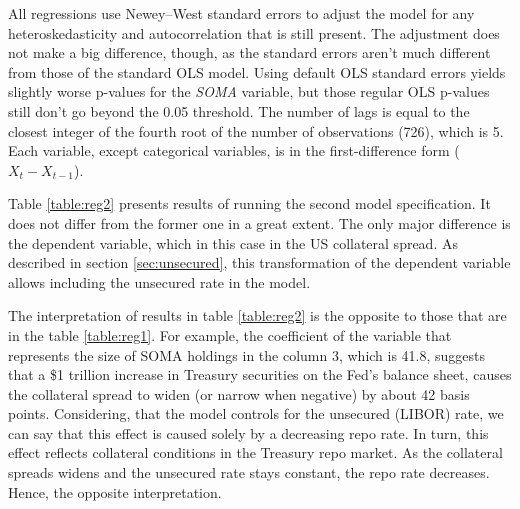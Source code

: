 \documentclass[11pt,a4paper,english,oneside]{article}
\begin{document}
All regressions use Newey–West standard errors to adjust the model for any heteroskedasticity and autocorrelation that is still present. The adjustment does not make a big difference, though, as the standard errors aren't much different from those of the standard OLS model. Using default OLS standard errors yields slightly worse p-values for the \emph{SOMA} variable, but those regular OLS p-values still don't go beyond the 0.05 threshold. The number of lags is equal to the closest integer of the fourth root of the number of observations (726), which is 5. Each variable, except categorical variables, is in the first-difference form ($X_t-X_{t-1}$).

Table \ref{table:reg2} presents results of running the second model specification. It does not differ from the former one in a great extent. The only major difference is the dependent variable, which in this case in the US collateral spread. As described in section \ref{sec:unsecured}, this transformation of the dependent variable allows including the unsecured rate in the model.

The interpretation of results in table \ref{table:reg2} is the opposite to those that are in the table \ref{table:reg1}. For example, the coefficient of the variable that represents the size of SOMA holdings in the column 3, which is 41.8, suggests that a \$1 trillion increase in Treasury securities on the Fed's balance sheet, causes the collateral spread to widen (or narrow when negative) by about 42 basis points. Considering, that the model controls for the unsecured (LIBOR) rate, we can say that this effect is caused solely by a decreasing repo rate. In turn, this effect reflects collateral conditions in the Treasury repo market. As the collateral spreads widens and the unsecured rate stays constant, the repo rate decreases. Hence, the opposite interpretation.

\end{document}
